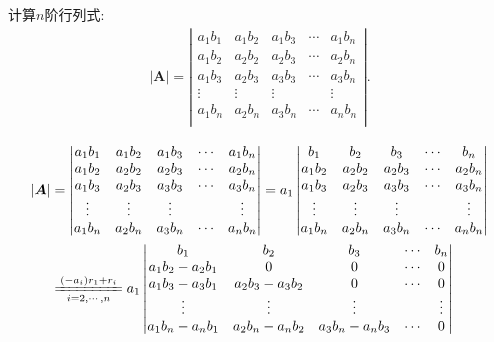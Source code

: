 \documentclass[../../main.tex]{subfiles}%
\begin{document}
\begin{example}
计算$n$阶行列式:
\begin{gather}
|\boldsymbol{A}|=\left| \begin{matrix}
a_1b_1&		a_1b_2&		a_1b_3&		\cdots&		a_1b_n\\
a_1b_2&		a_2b_2&		a_2b_3&		\cdots&		a_2b_n\\
a_1b_3&		a_2b_3&		a_3b_3&		\cdots&		a_3b_n\\
\vdots&		\vdots&		\vdots&		&		\vdots\\
a_1b_n&		a_2b_n&		a_3b_n&		\cdots&		a_nb_n\\
\end{matrix} \right|.
\nonumber
\end{gather}
\begin{solution}

\begin{align*}
|\boldsymbol{A}|&=\left| \begin{matrix}
a_1b_1&		a_1b_2&		a_1b_3&		\cdots&		a_1b_n\\
a_1b_2&		a_2b_2&		a_2b_3&		\cdots&		a_2b_n\\
a_1b_3&		a_2b_3&		a_3b_3&		\cdots&		a_3b_n\\
\vdots&		\vdots&		\vdots&		&		\vdots\\
a_1b_n&		a_2b_n&		a_3b_n&		\cdots&		a_nb_n\\
\end{matrix} \right|=a_1\left| \begin{matrix}
b_1&		b_2&		b_3&		\cdots&		b_n\\
a_1b_2&		a_2b_2&		a_2b_3&		\cdots&		a_2b_n\\
a_1b_3&		a_2b_3&		a_3b_3&		\cdots&		a_3b_n\\
\vdots&		\vdots&		\vdots&		&		\vdots\\
a_1b_n&		a_2b_n&		a_3b_n&		\cdots&		a_nb_n\\
\end{matrix} \right|
\\
&\xlongequal[i=2,\cdots ,n]{\left( -a_i \right) r_1+r_i}a_1\left| \begin{matrix}
b_1&		b_2&		b_3&		\cdots&		b_n\\
a_1b_2-a_2b_1&		0&		0&		\cdots&		0\\
a_1b_3-a_3b_1&		a_2b_3-a_3b_2&		0&		\cdots&		0\\
\vdots&		\vdots&		\vdots&		&		\vdots\\
a_1b_n-a_nb_1&		a_2b_n-a_nb_2&		a_3b_n-a_nb_3&		\cdots&		0\\
\end{matrix} \right|

\end{align*}
\end{solution}
\end{example}
\end{document}
